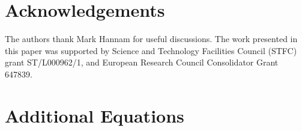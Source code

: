 \documentclass[twocolumn,aps,prd,floatfix,preprintnumbers,a4paper,nofootinbib,
superscriptaddress,10pt]{revtex4-1}
\begin{document}
\section*{Acknowledgements}
%
The authors thank Mark Hannam for useful discussions.
%
The work presented in this paper was supported by Science and Technology Facilities Council (STFC)
grant ST/L000962/1, and European Research Council Consolidator Grant 647839.
%

\newpage

%
\appendix


%
\newpage
\section{Additional Equations}
\label{app:eqns}



%
%
\begin{widetext}
  
\end{widetext}




\newpage
% 


\end{document}
